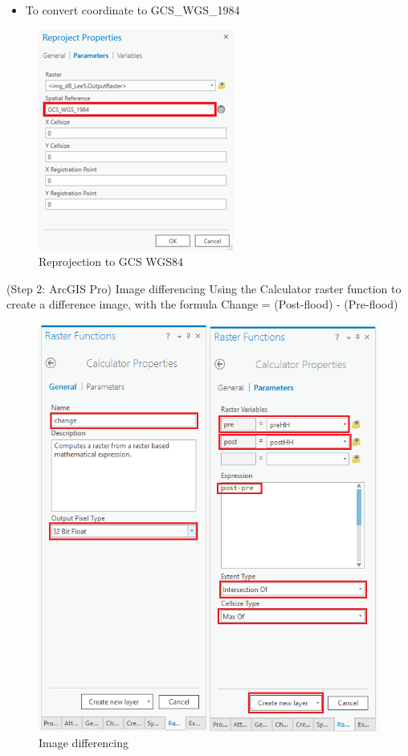 \documentclass[]{book}
\providecommand{\tightlist}{%
  \setlength{\itemsep}{0pt}\setlength{\parskip}{0pt}}
\theoremstyle{definition}
\theoremstyle{definition}
\theoremstyle{definition}
\theoremstyle{remark}
\begin{document}
\begin{itemize}
\tightlist
\item
  To convert coordinate to GCS\_WGS\_1984
\end{itemize}

\begin{figure}

{\centering \includegraphics[width=0.7\linewidth]{img/fig42_workflow4} 

}

\caption{Reprojection to GCS WGS84}\label{fig:fig42e}
\end{figure}

(Step 2: ArcGIS Pro) Image differencing Using the Calculator raster
function to create a difference image, with the formula Change =
(Post-flood) - (Pre-flood)

\begin{figure}

{\centering \includegraphics[width=0.7\linewidth]{img/fig42_workflow5} 

}

\caption{Image differencing}\label{fig:fig42f}
\end{figure}
\end{document}

